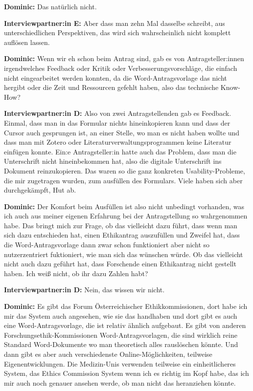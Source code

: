 \documentclass[a4paper,12pt,twoside]{scrreprt}
\begin{document}
\textbf{Dominic:} Das natürlich nicht.

\textbf{Interviewpartner:in E:} Aber dass man zehn Mal dasselbe schreibt, aus unterschiedlichen Perspektiven, das wird sich wahrscheinlich nicht komplett auflösen lassen.

\textbf{Dominic:} Wenn wir eh schon beim Antrag sind, gab es von Antragsteller:innen irgendwelches Feedback oder Kritik oder Verbesserungsvorschläge, die einfach nicht eingearbeitet werden konnten, da die Word-Antragsvorlage das nicht hergibt oder die Zeit und Ressourcen gefehlt haben, also das technische Know-How?

\textbf{Interviewpartner:in D:} Also von zwei Antragstellenden gab es Feedback. Einmal, dass man in das Formular nichts hineinkopieren kann und dass der Cursor auch gesprungen ist, an einer Stelle, wo man es nicht haben wollte und dass man mit Zotero oder Literaturverwaltungsprogrammen keine Literatur einfügen konnte. Ein:e Antragsteller:in hatte auch das Problem, dass man die Unterschrift nicht hineinbekommen hat, also die digitale Unterschrift ins Dokument reinzukopieren. Das waren so die ganz konkreten Usability-Probleme, die mir zugetragen wurden, zum ausfüllen des Formulars. Viele haben sich aber durchgekämpft, Hut ab.

\textbf{Dominic:} Der Komfort beim Ausfüllen ist also nicht unbedingt vorhanden, was ich auch aus meiner eigenen Erfahrung bei der Antragstellung so wahrgenommen habe. Das bringt mich zur Frage, ob das vielleicht dazu führt, dass wenn man sich dazu entschieden hat, einen Ethikantrag auszufüllen und Zweifel hat, dass die Word-Antragsvorlage dann zwar schon funktioniert aber nicht so nutzerzentriert fuktioniert, wie man sich das wünschen würde. Ob das vielleicht nicht auch dazu geführt hat, dass Forschende einen Ethikantrag nicht gestellt haben. Ich weiß nicht, ob ihr dazu Zahlen habt?

\textbf{Interviewpartner:in D:} Nein, das wissen wir nicht.

\textbf{Dominic:} Es gibt das Forum Österreichischer Ethikkommissionen, dort habe ich mir das System auch angesehen, wie sie das handhaben und dort gibt es auch eine Word-Antragsvorlage, die ist relativ ähnlich aufgebaut. Es gibt von anderen Forschungsethik-Kommissionen Word-Antragsvorlagen, die sind wirklich reine Standard Word-Dokumente wo man theoretisch alles rauslöschen könnte. Und dann gibt es aber auch verschiedenste Online-Möglichkeiten, teilweise Eigenentwicklungen. Die Medizin-Unis verwenden teilweise ein einheitlicheres System, das Ethics Commission System wenn ich es richtig im Kopf habe, das ich mir auch noch genauer ansehen werde, ob man nicht das heranziehen könnte.
\end{document}
